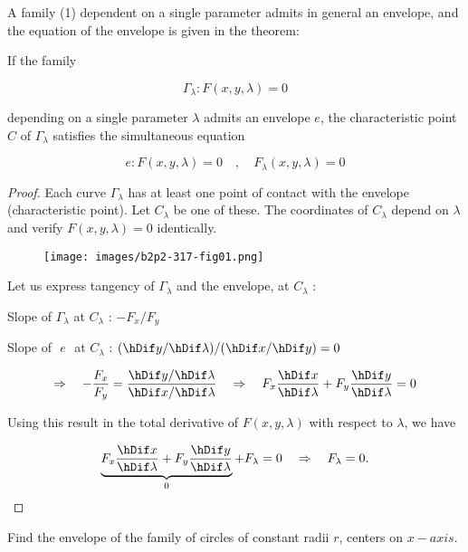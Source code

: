 \documentclass[11pt]{amsbook}
\begin{document}

A family (1) dependent on a single parameter admits in general an envelope, 
and the equation of the envelope is given in the theorem:

\begin{thm}
 
 If the family
 
 \[
  \Gamma_{\lambda} : F( x , y , \lambda ) = 0 \tag{1}
 \]
 
 depending on a single parameter $ \lambda $ admits an envelope $ e $, 
 the characteristic point $ C $ of $ \Gamma_{\lambda} $
 satisfies the simultaneous equation
 
 \[
  e: F( x , y , \lambda ) = 0
  \quad , \quad
  F_{\lambda}( x , y , \lambda ) = 0
 \]
 
\end{thm}


\begin{proof}
 
 Each curve $ \Gamma_{\lambda} $ has at least one point of contact with the envelope (characteristic point).
 Let $ C_{\lambda} $ be one of these.
 The coordinates of $ C_{\lambda} $ depend on $ \lambda $
 and verify $ F( x , y , \lambda ) = 0 $ identically.

 \begin{figure}[h]
   \begin{center}
     \texttt{[image: images/b2p2-317-fig01.png]}
   \end{center}
 \end{figure}
 
 Let us express tangency of $ \Gamma_{\lambda} $ and the envelope,
 at $ C_{\lambda} $ :

 Slope of $ \Gamma_{\lambda} $ at $ C_{\lambda} $
 \quad : \quad
 $ -F_{x} / F_{y} $
 
 Slope of $ \,\, e \,\, $ at $C_{\lambda} $
 \quad : \quad
 $ ( \hDif y / \hDif \lambda ) / ( \hDif x / \hDif y ) = 0 $
 
 \[  
  \Rightarrow \quad
  - \frac{ F_{x} }{ F_{y} } = \frac{ \hDif y / \hDif \lambda }{ \hDif x / \hDif \lambda }  
  \quad
  \Rightarrow \quad
  F_{x} \frac{ \hDif x }{ \hDif \lambda } + F_{y} \frac{ \hDif y }{ \hDif \lambda } = 0  
 \]
 
 
 Using this result in the total derivative of
 $ F( x , y , \lambda ) $ with respect to $ \lambda $, we have
 
 \[
  \underbrace{ F_{x} \frac{ \hDif x }{ \hDif \lambda } + F_{y} \frac{ \hDif y }{ \hDif \lambda } }_{0} + F_{\lambda} = 0
  \quad \Rightarrow \quad
  F_{\lambda} = 0.
 \]
 
\end{proof}


\begin{exmp}
 
 Find the envelope of the family of circles of constant radii $ r $, centers on $ x-axis $.
 
\end{exmp}
\end{document}
